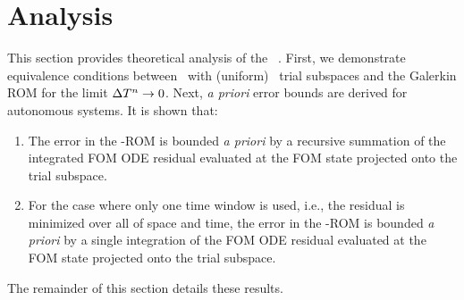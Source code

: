 \section{Analysis}\label{sec:analysis}
This section provides theoretical analysis of the \methodAcronym\ \approachKwd. First, we demonstrate equivalence conditions 
between \methodAcronym\  with (uniform) \spatialAcronym\ trial subspaces and the Galerkin ROM for the limit $\Delta T^{n} \rightarrow 0$.
Next, \textit{a priori} error bounds are derived for autonomous systems. It is shown that:
\begin{enumerate}
\item The error in the \methodAcronym-ROM is bounded \textit{a priori} by a recursive summation of the integrated FOM ODE residual evaluated at the FOM state projected onto the trial subspace. 
\item For the case where only 
one time window is used, i.e., the residual is minimized over all of space and time, the error in the \methodAcronym-ROM is bounded \textit{a priori} by a single 
integration of the FOM ODE residual evaluated at the FOM state projected onto the trial subspace. 
\end{enumerate}
The remainder of this section details these results. 

